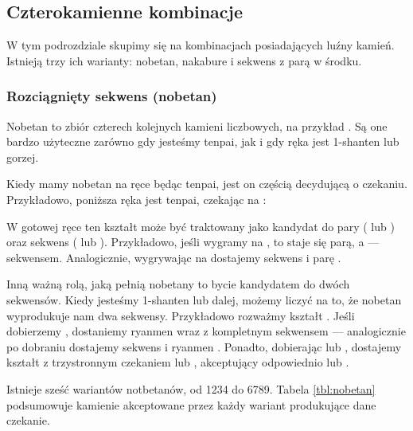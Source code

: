 \newpage
\subsection{Czterokamienne kombinacje}
W tym podrozdziale skupimy się na kombinacjach posiadających luźny kamień.
Istnieją trzy ich warianty: {\jap nobetan}, {\jap nakabure} i sekwens z parą w środku.

\subsubsection{Rozciągnięty sekwens ({\jap nobetan})} \label{sec:nobetan}
{\jap Nobetan} to zbiór czterech kolejnych kamieni liczbowych, na przykład .
Są one bardzo użyteczne zarówno gdy jesteśmy {\jap tenpai}, jak i gdy ręka jest 1-{\jap shanten} lub gorzej.

\bigskip
Kiedy mamy {\jap nobetan} na ręce będąc {\jap tenpai}, jest on częścią decydującą o czekaniu.
Przykładowo, poniższa ręka jest {\jap tenpai}, czekając na :
\begin{screen}
\end{screen}
W gotowej ręce ten kształt może być traktowany jako kandydat do pary ( lub ) oraz sekwens ( lub ).
Przykładowo, jeśli wygramy na , to  staje się parą, a  --- sekwensem.
Analogicznie, wygrywając na  dostajemy sekwens  i parę .

\bigskip
Inną ważną rolą, jaką pełnią {\jap nobetan}y to bycie kandydatem do dwóch sekwensów.
Kiedy jesteśmy 1-{\jap shanten} lub dalej, możemy liczyć na to, że {\jap nobetan} wyprodukuje nam dwa sekwensy.
Przykładowo rozważmy kształt .
Jeśli dobierzemy , dostaniemy {\jap ryanmen}  wraz z kompletnym sekwensem  --- analogicznie po dobraniu  dostajemy sekwens  i {\jap ryanmen} .
Ponadto, dobierając  lub , dostajemy kształt z trzystronnym czekaniem  lub , akceptujący odpowiednio  lub .

\bigskip
Istnieje sześć wariantów {\jap notbetan}ów, od 1234 do 6789.
Tabela \ref{tbl:nobetan} podsumowuje kamienie akceptowane przez każdy wariant produkujące dane czekanie.

